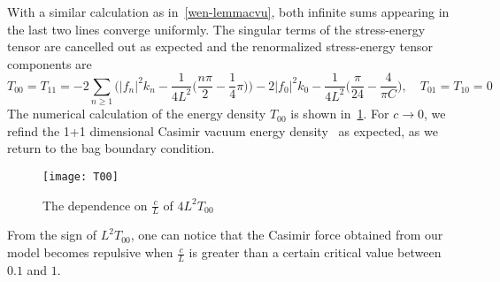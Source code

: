 With a similar calculation as in~\cref{wen-lemmacvu}, both infinite sums appearing in the last two lines converge uniformly.
The singular terms of the stress-energy tensor are cancelled out as expected and the renormalized stress-energy tensor components are
\begin{equation*}
T_{00} = T_{11}= - 2 \sum_{n \geq 1} \Big( |f_n|^2 k_n - 
\frac{1}{4L^2}\big(\frac{n\pi}{2} - \frac 1 4 \pi \big) \Big)
-2|f_0|^2k_0-\frac{1}{4L^2}\big(\frac{\pi}{24} - \frac{4}{\pi C}\big)
 , \quad
T_{01}=T_{10}  = 0
\end{equation*}
The numerical calculation of the energy density $T_{00}$ is shown in~\cref{plotex1d}.
For $c \rightarrow 0$, we refind the 1+1 dimensional Casimir vacuum energy density~\cite{Sundberg2003} as expected, as we return to the bag boundary condition.
%
\begin{figure}[!h]
  \centering
  \texttt{[image: T00]}
  \caption{The dependence on $\frac{c}{L}$ of $4L^2T_{00}$}\label{plotex1d}
\end{figure}
%
\begin{remark}
From the sign of $L^2 T_{00}$, one can notice that the Casimir force obtained from our model becomes repulsive when $\frac c L$ is greater than a certain critical value between $0.1$ and $1$.
\end{remark}







